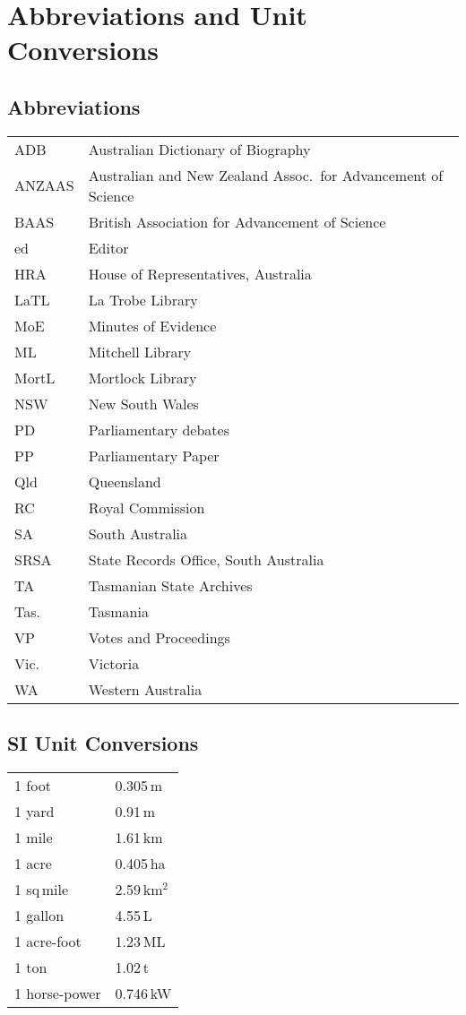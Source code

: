 
\chapter{Abbreviations and Unit Conversions}
\label{ch:abbrev}

{\small 

\section*{Abbreviations} 

\begin{tabular}{ll}
	ADB	& Australian Dictionary of Biography\\
	ANZAAS	& Australian and New Zealand Assoc.\ for Advancement of
                              Science\\
       	BAAS	& British Association for Advancement of Science\\
	ed	& Editor\\
	HRA	& House of Representatives, Australia\\
	LaTL	& La Trobe Library\\
	MoE	& Minutes of Evidence\\
	ML	& Mitchell Library\\
	MortL	& Mortlock Library\\
	NSW	& New South Wales\\
	PD	& Parliamentary debates\\
	PP	& Parliamentary Paper\\
	Qld	& Queensland\\
	RC	& Royal Commission\\
	SA	& South Australia\\
	SRSA	& State Records Office, South Australia\\
	TA	& Tasmanian State Archives\\
	Tas.	& Tasmania\\
	VP	& Votes and Proceedings\\
	Vic.	& Victoria\\
	WA	& Western Australia\\
\end{tabular}

\section*{SI Unit Conversions}

\begin{tabular}{ll}
	1 foot		& 0.305\,m \\
	1 yard		& 0.91\,m  \\
	1 mile		& 1.61\,km \\
	1 acre		& 0.405\,ha \\
	1 sq\,mile	& 2.59\,km$^2$ \\
	1 gallon	& 4.55\,L \\
	1 acre-foot	& 1.23\,ML \\
	1 ton		& 1.02\,t \\
	1 horse-power	& 0.746\,kW \\
\end{tabular}

}
